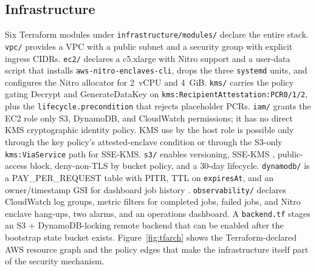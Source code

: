 \documentclass[11pt]{article}
\begin{document}
\subsection{Infrastructure}

Six Terraform modules under \texttt{infrastructure/modules/}
declare the entire stack. \texttt{vpc/} provides a VPC with a
public subnet and a security group with explicit ingress CIDRs.
\texttt{ec2/} declares a c5.xlarge with Nitro support and a
user-data script that installs \texttt{aws-nitro-enclaves-cli},
drops the three \texttt{systemd} units, and configures the Nitro
allocator for 2~vCPU and 4~GiB. \texttt{kms/} carries the policy
gating Decrypt and GenerateDataKey on
\texttt{kms:RecipientAttestation:PCR0/1/2}, plus the
\texttt{lifecycle.precondition} that rejects placeholder PCRs.
\texttt{iam/} grants the EC2 role only S3, DynamoDB, and CloudWatch
permissions; it has no direct KMS cryptographic identity policy. KMS
use by the host role is possible only through the key policy's
attested-enclave condition or through the S3-only
\texttt{kms:ViaService} path for SSE-KMS.
\texttt{s3/} enables versioning, SSE-KMS \cite{s3ssekms},
public-access block, deny-non-TLS by bucket policy, and a 30-day
lifecycle. \texttt{dynamodb/} is a PAY\_PER\_REQUEST table with
PITR, TTL on \texttt{expiresAt}, and an owner/timestamp GSI for
dashboard job history \cite{ddb}. \texttt{observability/} declares
CloudWatch log groups, metric filters for completed jobs, failed jobs,
and Nitro enclave hang-ups, two alarms, and an operations dashboard.
A \texttt{backend.tf} stages an S3 + DynamoDB-locking remote backend
that can be enabled after the bootstrap state bucket exists.
Figure~\ref{fig:tfarch} shows the Terraform-declared AWS resource
graph and the policy edges that make the infrastructure itself part of
the security mechanism.
\end{document}
